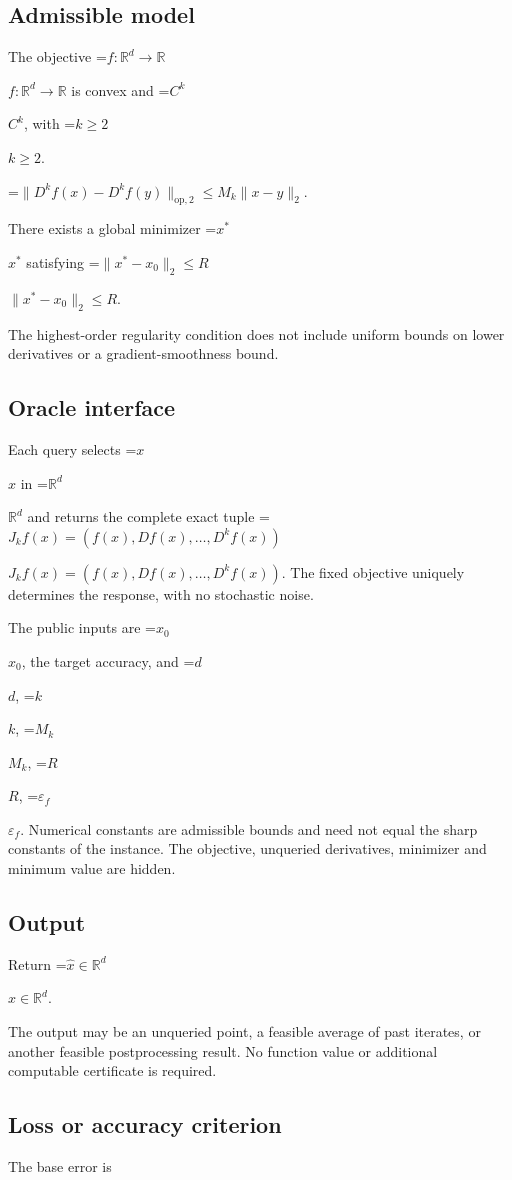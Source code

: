 \documentclass[10pt,a4paper]{article}
\newcommand{\AtlasMath}[1]{\par\begingroup\centering\setbox0=\hbox{$\displaystyle #1$}\ifdim\wd0>1.4\linewidth\typeout{ATLAS WIDE FORMULA: \the\wd0}\fi\ifdim\wd0>\linewidth\resizebox{\linewidth}{!}{\box0}\else\box0\fi\par\endgroup}
\newcommand{\AtlasInlineMath}[1]{\begingroup\setbox0=\hbox{$#1$}\ifdim\wd0>.4\linewidth\endgroup\AtlasMath{#1}\else\endgroup$#1$\fi}
\begin{document}
\subsection{Admissible model}
The objective \AtlasInlineMath{f:\mathbb{R}^d\to\mathbb{R}} is convex and \AtlasInlineMath{C^k}, with \AtlasInlineMath{k\ge2}.




\AtlasMath{\|D^{k}f(x)-D^{k}f(y)\|_{\mathrm{op},2}\le M_k\|x-y\|_{2}.}




There exists a global minimizer \AtlasInlineMath{x^*} satisfying \AtlasInlineMath{\|x^*-x_0\|_2\le R}.

The highest-order regularity condition does not include uniform bounds on lower derivatives or a gradient-smoothness bound.

\subsection{Oracle interface}
Each query selects \AtlasInlineMath{x} in \AtlasInlineMath{\mathbb{R}^d} and returns the complete exact tuple \AtlasInlineMath{J_{k}f(x)=(f(x),Df(x),\ldots,D^{k}f(x))}. The fixed objective uniquely determines the response, with no stochastic noise.

The public inputs are \AtlasInlineMath{x_0}, the target accuracy, and \AtlasInlineMath{d}, \AtlasInlineMath{k}, \AtlasInlineMath{M_k}, \AtlasInlineMath{R}, \AtlasInlineMath{\varepsilon_f}. Numerical constants are admissible bounds and need not equal the sharp constants of the instance. The objective, unqueried derivatives, minimizer and minimum value are hidden.

\subsection{Output}
Return \AtlasInlineMath{\widehat{x}\in \mathbb{R}^d}.

The output may be an unqueried point, a feasible average of past iterates, or another feasible postprocessing result. No function value or additional computable certificate is required.

\subsection{Loss or accuracy criterion}
The base error is
\end{document}
